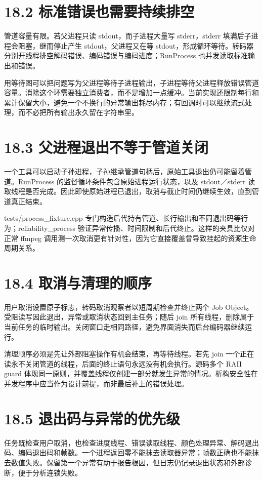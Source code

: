 \documentclass[UTF8,zihao=-4,openany]{ctexbook}
\begin{document}
\section*{18.2 标准错误也需要持续排空}
管道容量有限。若父进程只读 stdout，而子进程大量写 stderr，stderr 填满后子进程会阻塞，继而停止产生 stdout，父进程又在等 stdout，形成循环等待。转码器分别开线程排空解码错误、编码错误与编码进度；RunProcess 也并发读取标准输出和错误。

用等待图可以把问题写为父进程等待子进程输出，子进程等待父进程释放错误管道容量。消除这个环需要独立消费者，而不是增加一点缓冲。当前实现还限制每行和累计保留大小，避免一个不换行的异常输出耗尽内存；有回调时可以继续流式处理，而不必把所有输出永久留在字符串里。


\section*{18.3 父进程退出不等于管道关闭}
一个工具可以启动子孙进程，子孙继承管道句柄后，原始工具退出仍可能留着管道。RunProcess 的监督循环条件包含原始进程运行状态，以及 stdout／stderr 读取线程是否完成。因此即使原始进程已退出，取消与截止时间仍继续生效，直到管道真正结束。

tests/process\_fixture.cpp 专门构造后代持有管道、长行输出和不同退出码等行为；reliability\_process 验证异常传播、时间限制和后代终止。这样的夹具比仅对正常 ffmpeg 调用测一次取消更有针对性，因为它直接覆盖曾导致挂起的资源生命周期关系。


\section*{18.4 取消与清理的顺序}
用户取消设置原子标志，转码取消观察者以短周期检查并终止两个 Job Object。受阻读写因此退出，异常或取消状态回到主任务；随后 join 所有线程，删除属于当前任务的临时输出。关闭窗口走相同路径，避免界面消失而后台编码器继续运行。

清理顺序必须是先让外部阻塞操作有机会结束，再等待线程。若先 join 一个正在读永不关闭管道的线程，后面的终止语句永远没有机会执行。源码多个 RAII guard 体现同一原则，并覆盖线程仅创建一部分就发生异常的情况。析构安全性在并发程序中应当作为设计前提，而非最后补上的错误处理。


\section*{18.5 退出码与异常的优先级}
任务既检查用户取消，也检查进度线程、错误读取线程、颜色处理异常、解码退出码、编码退出码和帧数。一个进程返回零不能抹去读取器异常；帧数正确也不能抹去数值失败。保留第一个异常有助于报告根因，但日志仍记录退出状态和外部诊断，便于分析连锁失败。
\end{document}
